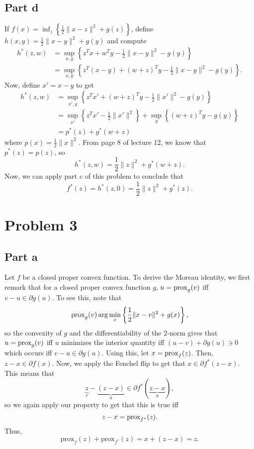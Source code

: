 \documentclass{article}
\begin{document}
\subsection{Part d}
If $f(x) = \inf_z \left\{\frac{1}{2}\|x-z\|^2 + g(z)\right\}$, define $h(x,y)=\frac{1}{2}\|x-y\|^2 + g(y)$ and compute
\begin{align*}
h^*(z,w)&=\sup_{x,y} \left\{ z^Tx+w^Ty -\frac{1}{2}\|x-y\|^2 - g(y)\right\}\\&=
\sup_{x,y} \left\{ z^T(x-y)+(w+z)^Ty -\frac{1}{2}\|x-y\|^2 - g(y)\right\}.
\end{align*}
Now, define $x'=x-y$ to get
\begin{align*}
h^*(z,w)&=\sup_{x',y} \left\{ z^Tx'+(w+z)^Ty -\frac{1}{2}\|x'\|^2 - g(y)\right\}\\&=
\sup_{x'} \left\{ z^Tx'-\frac{1}{2}\|x'\|^2\right\} +\sup_{y}\left\{(w+z)^Ty - g(y)\right\}\\&=
p^*(z)+g^*(w+z) 
\end{align*}
where $p(x)=\frac{1}{2}\|x\|^2$. From page 8 of lecture 12, we know that $p^*(z)=p(z)$, so 
\[
h^*(z,w)=\frac{1}{2}\|z\|^2+g^*(w+z).
\]
Now, we can apply part c of this problem to conclude that
\[
f^*(z)=h^*(z,0)=\frac{1}{2}\|z\|^2+g^*(z).
\]

\section{Problem 3}
\subsection{Part a}
Let $f$ be a closed proper convex function. To derive the Moreau identity, we first remark that for a closed proper convex function $g$, $u=\operatorname{prox}_g(v)$ iff $v-u\in\partial g(u)$. To see this, note that
\[
\operatorname{prox}_g(v)\arg\min_x\left\{\frac{1}{2}\|x-v\|^2+g(x)\right\},
\]
so the convexity of $g$ and the differentiability of the 2-norm gives that $u=\operatorname{prox}_g(v)$ iff $u$ minimizes the interior quantity iff $(u-v)+\partial g(u)\ni0$ which occurs iff $v-u\in\partial g(u)$. Using this, let $x=\operatorname{prox}_f(z)$. Then, $z-x\in\partial f(x)$. Now, we apply the Fenchel flip to get that $x\in\partial f^*(z-x)$. This means that 
\[
\underbrace{z}_{v}-\underbrace{(z-x)}_{u}\in\partial f^*(\underbrace{z-x}_u),
\]
so we again apply our property to get that this is true iff
\[
z-x=\operatorname{prox}_{f^*}(z).
\]
Thus,
\[
\mbox{prox}_{f}(z) + \mbox{prox}_{f^*}(z)=x+(z-x)=z.
\]
\end{document}
